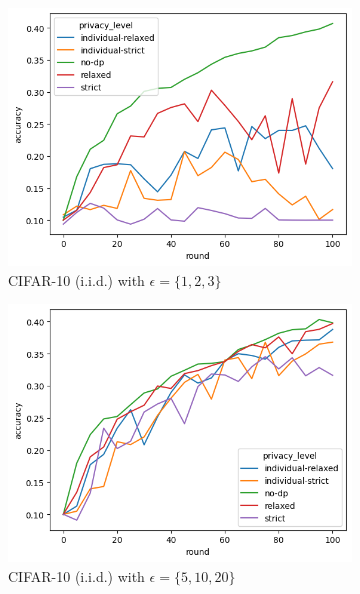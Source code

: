 \begin{figure}
	\centering
	\begin{subfigure}{0.4\textwidth}
		\centering
		\includegraphics[width=\linewidth]{Bilder/cifar10-accuracy-iid-eps-1-2-3.png}
		\caption{CIFAR-10 (i.i.d.) with $\epsilon = \{1,2,3\}$}
	\end{subfigure}
	\begin{subfigure}{0.4\textwidth}
		\centering
		\includegraphics[width=\linewidth]{Bilder/cifar10-accuracy-iid-eps-5-10-20.png}
		\caption{CIFAR-10 (i.i.d.) with $\epsilon = \{5,10,20\}$}
	\end{subfigure}
	\begin{subfigure}{0.4\textwidth}
		\centering

\end{subfigure}
\end{figure}
